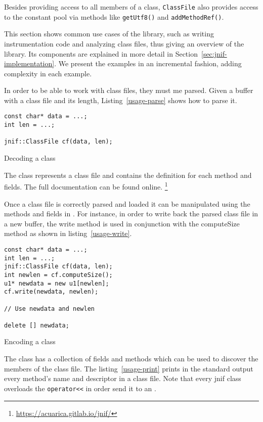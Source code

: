 Besides providing access to all members of a class,
\texttt{ClassFile} also provides access to the constant pool
via methods like \texttt{getUtf8()} and \texttt{addMethodRef()}.

This section shows common use cases of the \jnif{} library, 
such as writing instrumentation code and analyzing class files, 
thus giving an overview of the library. 
Its components are explained in more detail in Section~\ref{sec:jnif-implementation}.
We present the examples in an incremental fashion,
adding complexity in each example.

In order to be able to work with class files, they must me parsed. 
Given a buffer with a class file and its length, Listing~\ref{usage-parse} shows how to parse it.

\begin{listing}
\begin{verbatim}
const char* data = ...;
int len = ...;

jnif::ClassFile cf(data, len);
\end{verbatim}
\caption{Decoding a class}
\label{usage-parse}
\end{listing}

The class  represents a \java{} class file and contains the definition for each method and fields. 
The full documentation can be found online.%
\footnote{\url{https://acuarica.gitlab.io/jnif/}}

Once a class file is correctly parsed and loaded it can be manipulated using the methods and fields in .
For instance, in order to write back the parsed class file in a new buffer, the write method is used in conjunction with the computeSize method as shown in listing~\ref{usage-write}.

\begin{listing}
\begin{verbatim}
const char* data = ...;
int len = ...;
jnif::ClassFile cf(data, len);
int newlen = cf.computeSize();
u1* newdata = new u1[newlen];
cf.write(newdata, newlen);

// Use newdata and newlen

delete [] newdata;
\end{verbatim}
\caption{Encoding a class}
\label{usage-write}
\end{listing}

The  class has a collection of fields and methods which can be used to discover the members of the class file. 
The listing~\ref{usage-print} prints in the standard output every method's name and descriptor in a class file. 
Note that every jnif class overloads the \verb|operator<<| in order send it to an .

